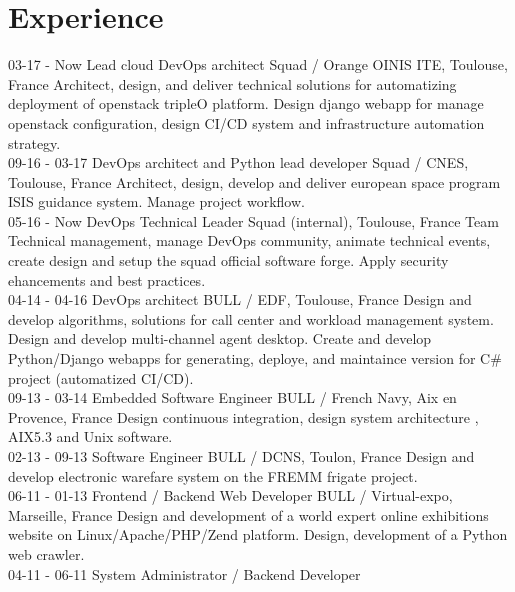 \documentclass[]{friggeri-cv}
\begin{document}
\section{Experience}
\begin{entrylist}
    \entry
        {03-17 - Now}
        {Lead cloud DevOps architect}
        {Squad / Orange OINIS ITE, Toulouse, France}
        {Architect, design, and deliver technical solutions for automatizing deployment of openstack tripleO platform.
        Design django webapp for manage openstack configuration, design CI/CD system and infrastructure automation strategy.\\}
    \entry
        {09-16 - 03-17}
        {DevOps architect and Python lead developer}
        {Squad / CNES, Toulouse, France}
        {Architect, design, develop and deliver european space program ISIS guidance system. Manage project workflow.\\}
    \entry
        {05-16 - Now}
        {DevOps Technical Leader}
        {Squad (internal), Toulouse, France}
        {Team Technical management, manage DevOps community, animate technical events, 
        create design and setup the squad official software forge. Apply security ehancements and best practices.\\}
    \entry
        {04-14 - 04-16}
        {DevOps architect}
        {BULL / EDF, Toulouse, France}
        {Design and develop algorithms, solutions for call center and workload management system. Design and develop multi-channel agent desktop.
        Create and develop Python/Django webapps for generating, deploye, and maintaince version for C\# project (automatized CI/CD).\\}
    \entry
        {09-13 - 03-14}
        {Embedded Software Engineer}
        {BULL / French Navy, Aix en Provence, France}
        {Design continuous integration, design system architecture , AIX5.3 and Unix software.\\}
    \entry
        {02-13 - 09-13}
        {Software Engineer}
        {BULL / DCNS, Toulon, France}
        {Design and develop electronic warefare system on the FREMM frigate project.\\}
    \entry
        {06-11 - 01-13}
        {Frontend / Backend Web Developer}
        {BULL / Virtual-expo, Marseille, France}
        {Design and development of a world expert online exhibitions website on Linux/Apache/PHP/Zend platform. Design, development of a Python web crawler.\\}
    \entry
        {04-11 - 06-11}
        {System Administrator / Backend Developer}

\end{entrylist}
\end{document}
